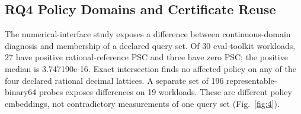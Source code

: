 \documentclass[11pt,a4paper]{article}
\begin{document}
\begin{table}[!htbp]
\caption{Phase-level benchmark comparison between Boundary-Aware Direct Probing and the proposed framework across four benchmark cohorts under invariant conditions (five repetitions; median and IQR; Simulated Cold-Chain models $N=37{,}471$ telemetry readings with deterministic rule-based $2\text{--}8^\circ\text{C}$ safe-window excursion criteria)}\label{tab:boundary_baseline}
\centering
\footnotesize
\setlength{\tabcolsep}{3pt}
\renewcommand{\arraystretch}{1.15}
\end{table}
\FloatBarrier


\subsection{RQ4 Policy Domains and Certificate Reuse}\label{subsec:rq4}

The numerical-interface study exposes a difference between continuous-domain diagnosis and membership of a declared query set. Of 30 eval-toolkit workloads, 27 have positive rational-reference PSC and three have zero PSC; the positive median is 3.747190e-16. Exact intersection finds no affected policy on any of the four declared rational decimal lattices. A separate set of 196 representable-binary64 probes exposes differences on 19 workloads. These are different policy embeddings, not contradictory measurements of one query set (Fig.~\ref{fig:4}).
\end{document}
